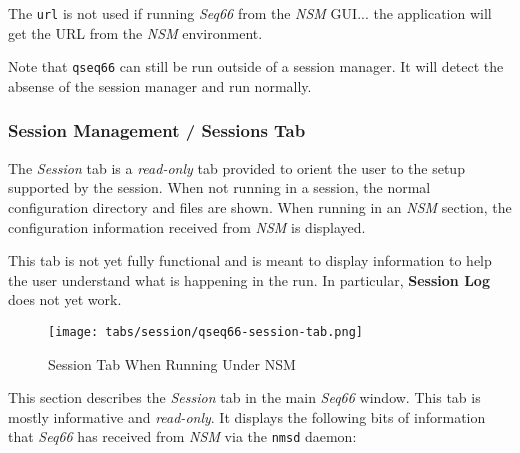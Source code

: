    The \texttt{url} is not used if running \textsl{Seq66} from the \textsl{NSM}
   GUI... the application will get the URL from the \textsl{NSM} environment.

   Note that \texttt{qseq66} can still be run outside of a
   session manager.  It will detect the absense of the session manager and run
   normally.

\subsubsection{Session Management / Sessions Tab}
\label{subsubsec:sessions_tab}

   The \textsl{Session} tab is a \textsl{read-only} tab
   provided to orient the user to the setup supported by the session.
   When not running in a session, the normal configuration directory and files
   are shown.  When running in an \textsl{NSM} section, the configuration
   information received from \textsl{NSM} is displayed.

   This tab is not yet fully functional and is meant to display information to
   help the user understand what is happening in the run.  In particular,
  \textbf{Session Log} does not yet work.

\begin{figure}[H]
   \centering 
   \texttt{[image: tabs/session/qseq66-session-tab.png]}
   \caption*{Session Tab When Running Under NSM}
\end{figure}

   This section describes the \textsl{Session} tab in the main
   \textsl{Seq66} window.  This tab is mostly informative and
   \textsl{read-only}.
   It displays the following bits of information that \textsl{Seq66} has received
   from \textsl{NSM} via the \texttt{nmsd} daemon:

